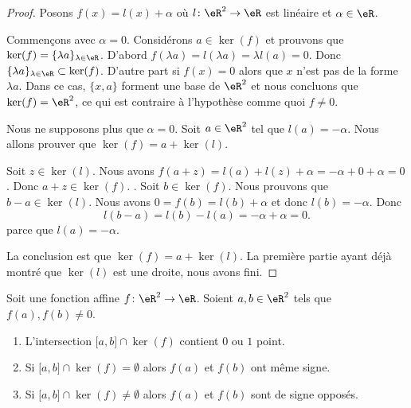 \begin{proof}
	Posons \( f(x)=l(x)+\alpha\) où \( l\colon \eR^2\to \eR\) est linéaire et \( \alpha\in \eR\).

	Commençons avec \( \alpha=0\). Considérons \( a\in \ker(f)\) et prouvons que \( \ker(f)=\{ \lambda a \}_{\lambda\in \eR}\). D'abord \( f(\lambda a)=l(\lambda a)=\lambda l(a)=0\). Donc \( \{ \lambda a \}_{\lambda\in \eR}\subset \ker(f)\). D'autre part si \( f(x)=0\) alors que \( x\) n'est pas de la forme \( \lambda a\). Dans ce cas, \( \{ x,a \}\) forment une base de \( \eR^2\) et nous concluons que \( \ker(f)=\eR^2\), ce qui est contraire à l'hypothèse comme quoi \( f\neq 0\).

	Nous ne supposons plus que \( \alpha=0\). Soit \( a\in \eR^2\) tel que \( l(a)=-\alpha\). Nous allons prouver que \( \ker(f)=a+\ker(l)\).
	\begin{subproof}
		Soit \( z\in \ker(l)\). Nous avons \( f(a+z)=l(a)+l(z)+\alpha=-\alpha+0+\alpha=0\). Donc \( a+z\in\ker(f)\).
		.
		Soit \( b\in \ker(f)\). Nous prouvons que \( b-a\in \ker(l)\). Nous avons \( 0=f(b)=l(b)+\alpha\) et donc \( l(b)=-\alpha\). Donc
		\begin{equation}
			l(b-a)=l(b)-l(a)=-\alpha+\alpha=0.
		\end{equation}
		parce que \( l(a)=-\alpha\).
	\end{subproof}
	La conclusion est que \( \ker(f)=a+\ker(l)\). La première partie ayant déjà montré que \( \ker(l)\) est une droite, nous avons fini.
\end{proof}

\begin{lemma}       \label{LEMooTOUOooJbpLVB}
	Soit une fonction affine \( f\colon \eR^2\to \eR\). Soient \( a,b\in \eR^2\) tels que \( f(a),f(b)\neq 0\).

	\begin{enumerate}
		\item       \label{ITEMooXLCFooQiDCrR}
		      L'intersection \( \mathopen[ a , b \mathclose]\cap\ker(f)\) contient \( 0\) ou \( 1\) point.
		\item       \label{ITEMooMORGooTzNefp}
		      Si \( \mathopen[ a , b \mathclose]\cap\ker(f)=\emptyset\) alors \( f(a)\) et \( f(b)\) ont même signe.
		\item       \label{ITEMooDWIQooXnoMJT}
		      Si \( \mathopen[ a , b \mathclose]\cap\ker(f)\neq\emptyset\) alors \( f(a)\) et \( f(b)\) sont de signe opposés.
	\end{enumerate}
\end{lemma}

